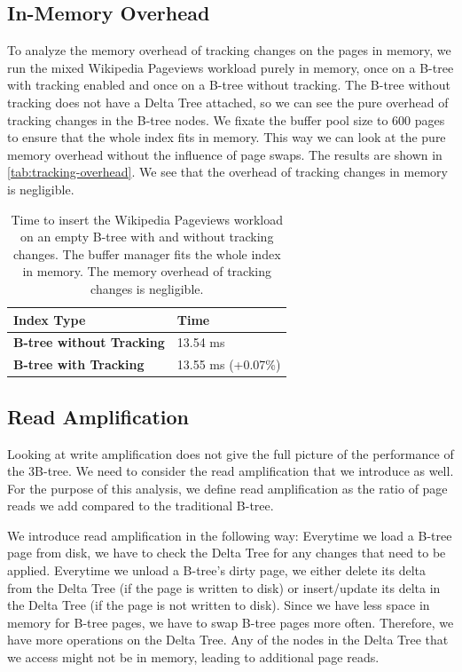 
\subsection{In-Memory Overhead}
To analyze the memory overhead of tracking changes on the pages in memory, we run the mixed Wikipedia Pageviews workload purely in memory, once on a B-tree with tracking enabled and once on a B-tree without tracking.
The B-tree without tracking does not have a Delta Tree attached, so we can see the pure overhead of tracking changes in the B-tree nodes.
We fixate the buffer pool size to 600 pages to ensure that the whole index fits in memory.
This way we can look at the pure memory overhead without the influence of page swaps.
The results are shown in \autoref{tab:tracking-overhead}.
We see that the overhead of tracking changes in memory is negligible.

\begin{table}[ht]
\centering
\begin{tabular}{l|l}
\toprule
\textbf{Index Type} & Time \\
\midrule
\textbf{B-tree without Tracking}  & 13.54 ms \\
\textbf{B-tree with Tracking}  & 13.55 ms (+0.07\%) \\
\bottomrule
\end{tabular}
\caption{Time to insert the Wikipedia Pageviews workload on an empty B-tree with and without tracking changes. The buffer manager fits the whole index in memory. The memory overhead of tracking changes is negligible.}
\label{tab:tracking-overhead}
\end{table}

\subsection{Read Amplification}
Looking at write amplification does not give the full picture of the performance of the 3B-tree.
We need to consider the read amplification that we introduce as well.
For the purpose of this analysis, we define read amplification as the ratio of page reads we add compared to the traditional B-tree.

We introduce read amplification in the following way:
Everytime we load a B-tree page from disk, we have to check the Delta Tree for any changes that need to be applied.
Everytime we unload a B-tree's dirty page, we either delete its delta from the Delta Tree (if the page is written to disk) or insert/update its delta in the Delta Tree (if the page is not written to disk).
Since we have less space in memory for B-tree pages, we have to swap B-tree pages more often.
Therefore, we have more operations on the Delta Tree.
Any of the nodes in the Delta Tree that we access might not be in memory, leading to additional page reads.

